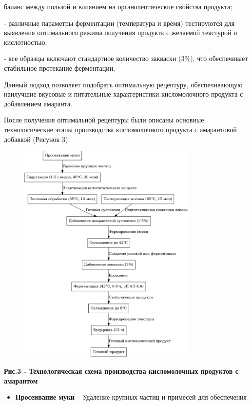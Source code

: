{баланс между пользой и влиянием на органолептические свойства продукта;

- различные параметры ферментации (температура и время) тестируются для
выявления оптимального режима получения продукта с желаемой текстурой и
кислотностью;

- все образцы включают стандартное количество закваски (3\%), что
обеспечивает стабильное протекание ферментации.

Данный подход позволяет подобрать оптимальную рецептуру, обеспечивающую
наилучшие вкусовые и питательные характеристики кисломолочного продукта
с добавлением амаранта.

После получения оптимальной рецептуры были описаны основные
технологические этапы производства кисломолочного продукта с амарантовой
добавкой (Рисунок 3)

\begin{figure}[H]
	\centering
	\includegraphics[width=0.8\textwidth]{media/pish2/image22}
	\caption*{}
\end{figure}


{\bfseries Рис.3 - Технологическая схема производства кисломолочных
продуктов с амарантом}

\begin{itemize}
\item
  {\bfseries Просеивание муки} -- Удаление крупных частиц и примесей для
  обеспечения
\end{itemize}

}
